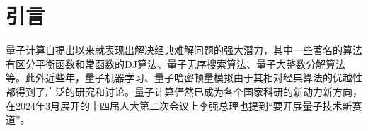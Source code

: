\documentclass[10.5pt,compsoc,UTF8]{CjC}
\theoremstyle{mystyle}
\begin{document}




\vskip 10mm




\section{\heiti 引言}


量子计算自提出以来就表现出解决经典难解问题的强大潜力，其中一些著名的算法有区分平衡函数和常函数的DJ算法\cite{deutsch1992rapid}、量子无序搜索算法\cite{grover1996fast}、量子大整数分解算法\cite{Shor1994Polynominal}等。此外近些年，量子机器学习\cite{biamonte2017quantum}、量子哈密顿量模拟由于其相对经典算法的优越性\cite{berry2015simulating,low2017optimal,low2019hamiltonian,berry2015hamiltonian}都得到了广泛的研究和讨论。量子计算俨然已成为各个国家科研的新动力新方向，在2024年3月展开的十四届人大第二次会议上李强总理也提到``要开展量子技术新赛道''。
\end{document}
